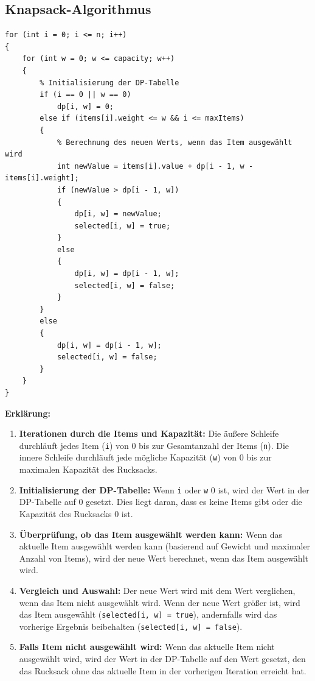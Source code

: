 \subsection*{Knapsack-Algorithmus}
\begin{lstlisting}[style=csharp, caption={}, label=code:dynamic]
for (int i = 0; i <= n; i++)
{
    for (int w = 0; w <= capacity; w++)
    {
        % Initialisierung der DP-Tabelle
        if (i == 0 || w == 0)
            dp[i, w] = 0;
        else if (items[i].weight <= w && i <= maxItems)
        {
            % Berechnung des neuen Werts, wenn das Item ausgewählt wird
            int newValue = items[i].value + dp[i - 1, w - items[i].weight];
            if (newValue > dp[i - 1, w])
            {
                dp[i, w] = newValue;
                selected[i, w] = true;
            }
            else
            {
                dp[i, w] = dp[i - 1, w];
                selected[i, w] = false;
            }
        }
        else
        {
            dp[i, w] = dp[i - 1, w];
            selected[i, w] = false;
        }
    }
}
\end{lstlisting}

\textbf{Erklärung:}
\begin{enumerate}
    \item \textbf{Iterationen durch die Items und Kapazität:} Die äußere Schleife durchläuft jedes Item
    (\texttt{i}) von 0 bis zur Gesamtanzahl der Items (\texttt{n}). Die innere Schleife durchläuft jede mögliche
    Kapazität (\texttt{w}) von 0 bis zur maximalen Kapazität des Rucksacks.

    \item \textbf{Initialisierung der DP-Tabelle:} Wenn \texttt{i} oder \texttt{w} 0 ist, wird der Wert in der
    DP-Tabelle auf 0 gesetzt. Dies liegt daran, dass es keine Items gibt oder die Kapazität des Rucksacks 0 ist.

    \item \textbf{Überprüfung, ob das Item ausgewählt werden kann:} Wenn das aktuelle Item ausgewählt werden
    kann (basierend auf Gewicht und maximaler Anzahl von Items), wird der neue Wert berechnet, wenn das Item
    ausgewählt wird.

    \item \textbf{Vergleich und Auswahl:} Der neue Wert wird mit dem Wert verglichen, wenn das Item nicht
    ausgewählt wird. Wenn der neue Wert größer ist, wird das Item ausgewählt (\texttt{selected[i, w] = true}),
    andernfalls wird das vorherige Ergebnis beibehalten (\texttt{selected[i, w] = false}).

    \item \textbf{Falls Item nicht ausgewählt wird:} Wenn das aktuelle Item nicht ausgewählt wird, wird der
    Wert in der DP-Tabelle auf den Wert gesetzt, den das Rucksack ohne das aktuelle Item in der vorherigen
    Iteration erreicht hat.\\
\end{enumerate}

